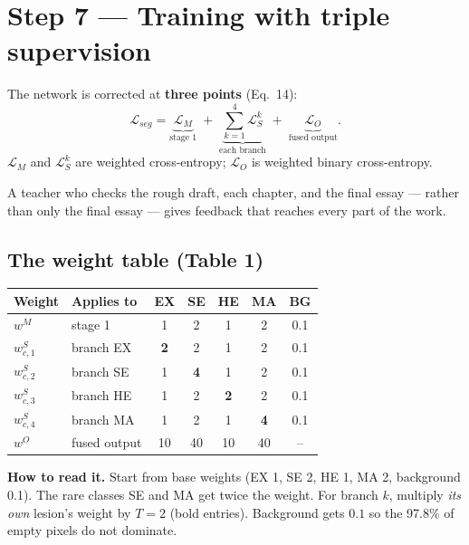 \documentclass[11pt,a4paper]{article}
\begin{document}
\section{Step 7 --- Training with triple supervision}
\begin{idea}
The network is corrected at \textbf{three points} (Eq.~14):
\[
\mathcal{L}_{seg} = \underbrace{\mathcal{L}_M}_{\text{stage 1}} \;+\;
\underbrace{\textstyle\sum_{k=1}^{4}\mathcal{L}_S^{k}}_{\text{each branch}} \;+\;
\underbrace{\mathcal{L}_O}_{\text{fused output}} .
\]
$\mathcal{L}_M$ and $\mathcal{L}_S^k$ are weighted cross-entropy; $\mathcal{L}_O$ is weighted binary
cross-entropy.
\end{idea}

\begin{analogy}
A teacher who checks the rough draft, each chapter, and the final essay --- rather than only the final
essay --- gives feedback that reaches every part of the work.
\end{analogy}

\subsection*{The weight table (Table 1)}
\begin{center}
\small
\begin{tabular}{@{}llccccc@{}}
\toprule
Weight & Applies to & EX & SE & HE & MA & BG\\
\midrule
$w^M$ & stage 1 & 1 & 2 & 1 & 2 & 0.1\\
$w^S_{c,1}$ & branch EX & \textbf{2} & 2 & 1 & 2 & 0.1\\
$w^S_{c,2}$ & branch SE & 1 & \textbf{4} & 1 & 2 & 0.1\\
$w^S_{c,3}$ & branch HE & 1 & 2 & \textbf{2} & 2 & 0.1\\
$w^S_{c,4}$ & branch MA & 1 & 2 & 1 & \textbf{4} & 0.1\\
$w^O$ & fused output & 10 & 40 & 10 & 40 & --\\
\bottomrule
\end{tabular}
\end{center}

\textbf{How to read it.} Start from base weights (EX 1, SE 2, HE 1, MA 2, background 0.1). The rare
classes SE and MA get twice the weight. For branch $k$, multiply \emph{its own} lesion's weight by
$T=2$ (bold entries). Background gets $0.1$ so the 97.8\% of empty pixels do not dominate.
\end{document}
